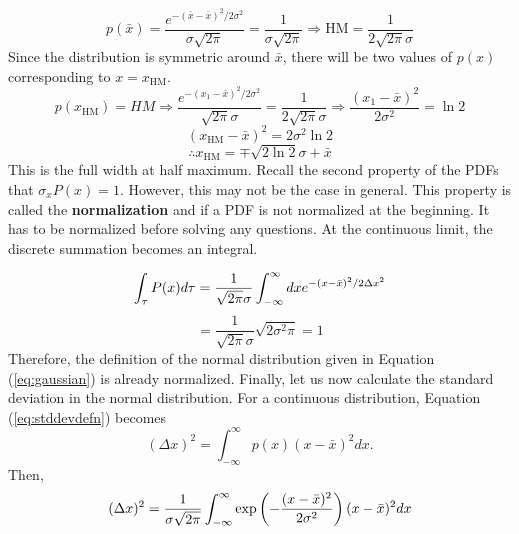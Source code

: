         \begin{equation}
            p(\bar{x}) = \frac{e^{-(\bar{x}-\bar{x})^2/2\sigma^2}}{\sigma\sqrt{2\pi}} = \frac{1}{\sigma\sqrt{2\pi}} \Rightarrow \text{HM} = \frac{1}{2\sqrt{2\pi}\sigma}
        \end{equation}
        Since the distribution is symmetric around $\bar{x}$, there will be two values of $p(x)$ corresponding to $x=x_\text{HM}$. 
        \begin{equation}
            p(x_\text{HM}) = HM \Rightarrow \frac{e^{-(x_1-\bar{x})^2/2\sigma^2}}{\sqrt{2\pi}\sigma} = \frac{1}{2\sqrt{2\pi}\sigma} \Rightarrow \frac{(x_1-\bar{x})^2}{2\sigma^2} = \ln2 
        \end{equation}
        \begin{equation}
            (x_\text{HM}-\bar{x})^2 = 2\sigma^2\ln2
        \end{equation}
        \begin{equation}
            \therefore x_\text{HM} = \mp\sqrt{2\ln2}\sigma+\bar{x}
        \end{equation}
        This is the full width at half maximum.
        Recall the second property of the PDFs that $\sigma_xP(x)=1$. However, this may not be the case in general. This property is called the \textbf{normalization} and if a PDF is not normalized at the beginning. It has to be normalized before solving any questions. At the continuous limit, the discrete summation becomes an integral.
        
        \begin{equation}
            \int_\mathcal{\tau}P(x)d\tau = \frac{1}{\sqrt{2\pi}\sigma}\int_{-\infty}^{\infty}dxe^{-(x-\bar{x})^2/2\Delta x^2} \notag 
        \end{equation}
        \begin{equation}
            = \frac{1}{\sqrt{2\pi}\sigma}\sqrt{2\sigma^2\pi} = 1
        \end{equation}
        Therefore, the definition of the normal distribution given in Equation (\ref{eq:gaussian}) is already normalized. Finally, let us now calculate the standard deviation in the normal distribution. For a continuous distribution, Equation (\ref{eq:stddevdefn}) becomes
        \begin{equation}
            (\Delta x)^2=\int_{-\infty}^\infty p(x)(x-\bar{x})^2 dx.
        \end{equation}
        Then,
        \begin{equation}
            (\Delta x)^2 = \frac{1}{\sigma\sqrt{2\pi}}\int_{-\infty}^{\infty}\exp\left( -\frac{(x-\bar{x})^2}{2\sigma^2} \right)(x-\bar{x})^2dx
        \end{equation}

